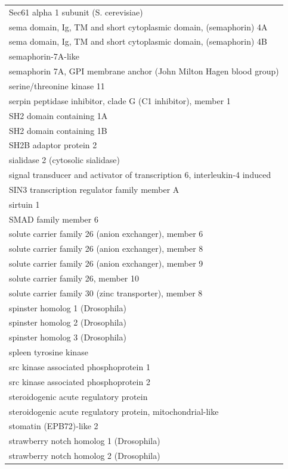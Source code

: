 \documentclass[english]{article}\usepackage[]{graphicx}\usepackage[]{color}
\begin{document}
\begin{longtable}{l}
Sec61 alpha 1 subunit (S. cerevisiae) \\ 
sema domain, Ig, TM and short cytoplasmic domain, (semaphorin) 4A \\ 
sema domain, Ig, TM and short cytoplasmic domain, (semaphorin) 4B \\ 
semaphorin-7A-like \\ 
semaphorin 7A, GPI membrane anchor (John Milton Hagen blood group) \\ 
serine/threonine kinase 11 \\ 
serpin peptidase inhibitor, clade G (C1 inhibitor), member 1 \\ 
SH2 domain containing 1A \\ 
SH2 domain containing 1B \\ 
SH2B adaptor protein 2 \\ 
sialidase 2 (cytosolic sialidase) \\ 
signal transducer and activator of transcription 6, interleukin-4 induced \\ 
SIN3 transcription regulator family member A \\ 
sirtuin 1 \\ 
SMAD family member 6 \\ 
solute carrier family 26 (anion exchanger), member 6 \\ 
solute carrier family 26 (anion exchanger), member 8 \\ 
solute carrier family 26 (anion exchanger), member 9 \\ 
solute carrier family 26, member 10 \\ 
solute carrier family 30 (zinc transporter), member 8 \\ 
spinster homolog 1 (Drosophila) \\ 
spinster homolog 2 (Drosophila) \\ 
spinster homolog 3 (Drosophila) \\ 
spleen tyrosine kinase \\ 
src kinase associated phosphoprotein 1 \\ 
src kinase associated phosphoprotein 2 \\ 
steroidogenic acute regulatory protein \\ 
steroidogenic acute regulatory protein, mitochondrial-like \\ 
stomatin (EPB72)-like 2 \\ 
strawberry notch homolog 1 (Drosophila) \\ 
strawberry notch homolog 2 (Drosophila) \\ 

\end{longtable}
\end{document}
